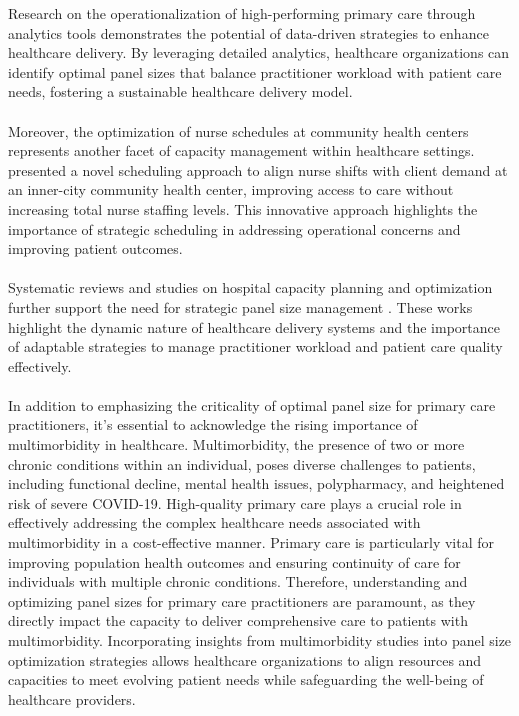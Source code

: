 \documentclass[11pt]{article}
\theoremstyle{definition}
\begin{document}
Research on the operationalization of high-performing primary care through analytics tools \cite{joe2020} demonstrates the potential of data-driven strategies to enhance healthcare delivery. By leveraging detailed analytics, healthcare organizations can identify optimal panel sizes that balance practitioner workload with patient care needs, fostering a sustainable healthcare delivery model.\\\\
Moreover, the optimization of nurse schedules at community health centers represents another facet of capacity management within healthcare settings. \cite{zimmerman2021} presented a novel scheduling approach to align nurse shifts with client demand at an inner-city community health center, improving access to care without increasing total nurse staffing levels. This innovative approach highlights the importance of strategic scheduling in addressing operational concerns and improving patient outcomes.\\\\
Systematic reviews and studies on hospital capacity planning and optimization further support the need for strategic panel size management \cite{shekelle2019, humphreys2022, zhu2019}. These works highlight the dynamic nature of healthcare delivery systems and the importance of adaptable strategies to manage practitioner workload and patient care quality effectively.\\\\
In addition to emphasizing the criticality of optimal panel size for primary care practitioners, it's essential to acknowledge the rising importance of multimorbidity in healthcare. Multimorbidity, the presence of two or more chronic conditions within an individual, poses diverse challenges to patients, including functional decline, mental health issues, polypharmacy, and heightened risk of severe COVID-19. High-quality primary care plays a crucial role in effectively addressing the complex healthcare needs associated with multimorbidity in a cost-effective manner. Primary care is particularly vital for improving population health outcomes and ensuring continuity of care for individuals with multiple chronic conditions. Therefore, understanding and optimizing panel sizes for primary care practitioners are paramount, as they directly impact the capacity to deliver comprehensive care to patients with multimorbidity. Incorporating insights from multimorbidity studies into panel size optimization strategies allows healthcare organizations to align resources and capacities to meet evolving patient needs while safeguarding the well-being of healthcare providers.\cite{hu2022}\\\\
\end{document}
